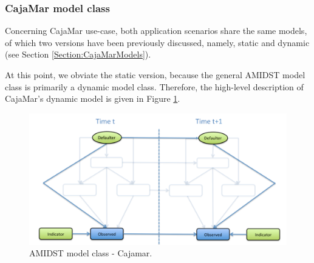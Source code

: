\subsubsection{CajaMar model class}\label{cajamarAMIDSTModels}
Concerning CajaMar use-case, both application scenarios share the same models, of which two versions have been previously discussed, namely, static and dynamic (see Section \ref{Section:CajaMarModels}). 

At this point, we obviate the static version, because the general AMIDST model class is primarily a dynamic model class. Therefore, the high-level description of CajaMar's dynamic model is given in Figure \ref{Figure:AMIDSTModelClassCajamar}. %


\begin{figure}[ht!]
\begin{center}
\includegraphics[scale=0.39]{./figures/AMIDSTModelClassCajamar.png}
\caption{\label{Figure:AMIDSTModelClassCajamar} AMIDST model class - Cajamar.}
\end{center}
\end{figure}


